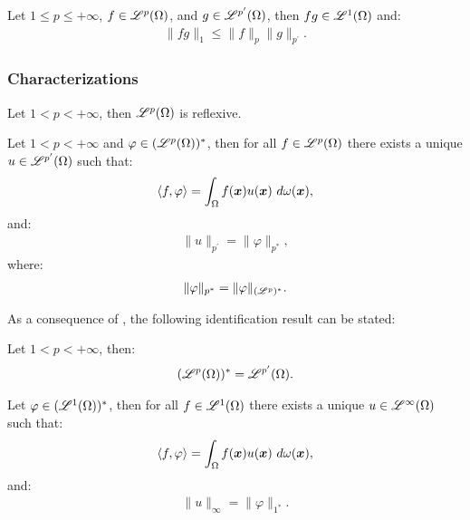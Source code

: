 \begin{theorem}
    Let $1 \leq p \leq +\infty$, $f \in \mathscr{L}^{p}(\Omega)$, and $g \in \mathscr{L}^{p^{\prime}}(\Omega)$, then $fg \in \mathscr{L}^{1}(\Omega)$ and:
    \begin{align}
        \lVert fg \rVert_1 \leq \lVert f \rVert_p \lVert g \rVert_{p^{\prime}}.
    \end{align}
\end{theorem}

\subsubsection{Characterizations}

\begin{theorem}
    Let $1 < p < +\infty$, then $\mathscr{L}^{p}(\Omega)$ is reflexive.
\end{theorem}

\begin{theorem} \label{theorem:riesz_p}
    Let $1 < p < +\infty$ and $\varphi \in (\mathscr{L}^{p}(\Omega))^*$, then for all $f \in \mathscr{L}^{p}(\Omega)$ there exists a unique $u \in \mathscr{L}^{p^{\prime}}(\Omega)$ such that:
    \begin{align}
        \langle f, \varphi \rangle = \int_{\Omega} f(\bm{x}) u(\bm{x}) ~ d \omega(\bm{x}),
    \end{align}
    and:
    \begin{align}
        \lVert u \rVert_{p^{\prime}} = \lVert \varphi \rVert_{p^*},
    \end{align}
    where:
    \begin{align}
        \lVert \varphi \rVert_{p^*} = \lVert \varphi \rVert_{(\mathscr{L}^{p})^*}.
    \end{align}
\end{theorem}

As a consequence of , the following identification result can be stated:

\begin{theorem}
    Let $1 < p < +\infty$, then:
    \begin{align}
        (\mathscr{L}^{p}(\Omega))^* = \mathscr{L}^{p^{\prime}}(\Omega).
    \end{align}
\end{theorem}

\begin{theorem}[Riesz representation theorem for $p = 1$] \label{theorem:riesz_1}
    Let $\varphi \in (\mathscr{L}^{1}(\Omega))^*$, then for all $f \in \mathscr{L}^{1}(\Omega)$ there exists a unique $u \in \mathscr{L}^{\infty}(\Omega)$ such that:
    \begin{align}
        \langle f, \varphi \rangle = \int_{\Omega} f(\bm{x}) u(\bm{x}) ~ d \omega(\bm{x}),
    \end{align}
    and:
    \begin{align}
        \lVert u \rVert_{\infty} = \lVert \varphi \rVert_{1^*}.
    \end{align}
\end{theorem}


